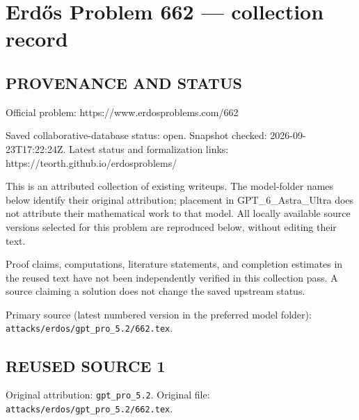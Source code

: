 \section*{Erd\H{o}s Problem 662 --- collection record}

\subsection*{PROVENANCE AND STATUS}
Official problem: https://www.erdosproblems.com/662

Saved collaborative-database status: open.
Snapshot checked: 2026-09-23T17:22:24Z.
Latest status and formalization links: https://teorth.github.io/erdosproblems/

This is an attributed collection of existing writeups. The model-folder names below identify their original attribution; placement in GPT\_6\_Astra\_Ultra does not attribute their mathematical work to that model. All locally available source versions selected for this problem are reproduced below, without editing their text.

Proof claims, computations, literature statements, and completion estimates in the reused text have not been independently verified in this collection pass. A source claiming a solution does not change the saved upstream status.

Primary source (latest numbered version in the preferred model folder): \texttt{attacks/erdos/gpt\_pro\_5.2/662.tex}.

\subsection*{REUSED SOURCE 1}
Original attribution: \texttt{gpt\_pro\_5.2}.
Original file: \texttt{attacks/erdos/gpt\_pro\_5.2/662.tex}.


